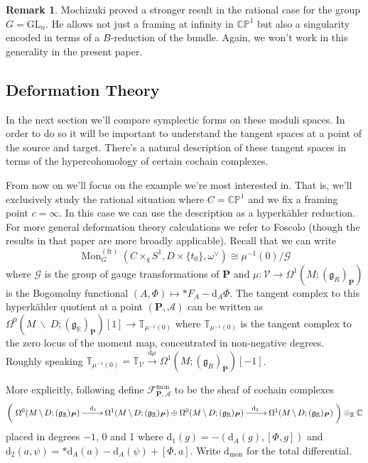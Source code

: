 \documentclass[11pt, oneside, reqno]{amsart}
\theoremstyle{definition} \newtheorem{definition}{Definition}[section]
\theoremstyle{definition} \newtheorem{remark}[definition]{Remark}
\theoremstyle{definition} \newtheorem{remarks}[definition]{Remarks}
\theoremstyle{definition} \newtheorem{question}[definition]{Question}
\theoremstyle{definition} \newtheorem*{note}{Note}
\theoremstyle{definition} \newtheorem{example}[definition]{Example}
\theoremstyle{definition} \newtheorem{examples}[definition]{Examples}
\renewcommand{\gg}{\mathfrak{g}}
\newcommand{\bb}[1]{\mathbb{#1}}
\newcommand{\mr}[1]{\mathrm{#1}}
\newcommand{\mc}[1]{\mathcal{#1}}
\newcommand{\bo}[1]{\boldsymbol{#1}}
\newcommand{\bs}{\ \backslash \ }
\newcommand{\CC}{\mathbb{C}}
\newcommand{\RR}{\mathbb{R}}
\newcommand{\GL}{\mathrm{GL}}
\newcommand{\iso}{\cong}
\DeclareMathOperator{\mon}{Mon}
\renewcommand{\d}{\mathrm{d}}
\newcommand{\fr}{\mathrm{fr}}
\begin{document}
\begin{remark}
Mochizuki \cite{Mochizuki} proved a stronger result in the rational case for the group $G = \GL_n$.  He allows not just a framing at infinity in $\bb{CP}^1$ but also a singularity encoded in terms of a $B$-reduction of the bundle.  Again, we won't work in this generality in the present paper.
\end{remark}

\subsection{Deformation Theory} \label{def_section}
In the next section we'll compare symplectic forms on these moduli spaces.  In order to do so it will be important to understand the tangent spaces at a point of the source and target.  There's a natural description of these tangent spaces in terms of the hypercohomology of certain cochain complexes.

From now on we'll focus on the example we're most interested in.  That is, we'll exclusively study the rational situation where $C = \bb{CP}^1$ and we fix a framing point $c = \infty$.  In this case we can use the description as a hyperk\"ahler reduction.  For more general deformation theory calculations we refer to Foscolo \cite{FoscoloDef} (though the results in that paper are more broadly applicable).  Recall that we can write
\[\mon^{(\fr)}_G(C \times_q S^1, D \times \{t_0\}, \omega^\vee) \iso \mu^{-1}(0)/ \mc G\]
where $\mc G$ is the group of gauge transformations of $\bo P$ and $\mu \colon \mc V \to \Omega^1(M; (\gg_R)_{\bo P})$ is the Bogomolny functional $(A,\Phi) \mapsto \ast F_A - \d_A \Phi$.  The tangent complex to this hyperk\"ahler quotient at a point $(\bo P, \mc A)$ can be written as $\Omega^0(M \!\bs\! D; (\gg_\RR)_{\bo P})[1] \to \bb T_{\mu^{-1}(0)}$ where $\bb T_{\mu^{-1}(0)}$ is the tangent complex to the zero locus of the moment map, concentrated in non-negative degrees. Roughly speaking $\bb T_{\mu^{-1}(0)} = \bb T_{\mc V} \overset {\d\mu} \to \Omega^1(M; (\gg_R)_{\bo P})[-1]$.  

More explicitly, following \cite{FoscoloDef} define $\mc F^{\mr{mon}}_{\bo P, \mc A}$ to be the sheaf of cochain complexes
\[\left(\xymatrix{
\Omega^0(M \!\bs\! D; (\gg_\RR)_{\bo P}) \ar[r]^(.36){\d_1} &\Omega^1(M \!\bs\! D; (\gg_\RR)_{\bo P}) \oplus \Omega^0(M \!\bs\! D; (\gg_\RR)_{\bo P}) \ar[r]^(.64){\d_2} &\Omega^1(M \!\bs\! D; (\gg_\RR)_{\bo P})
}\right) \otimes_\RR \CC\]
placed in degrees $-1$, 0 and 1 where $\d_1(g) = -(\d_A(g),[\Phi, g])$ and $\d_2(a,\psi) = \ast \d_A(a) - \d_A(\psi) + [\Phi,a]$.  Write $\d_{\mr{mon}}$ for the total differential.
\end{document}
